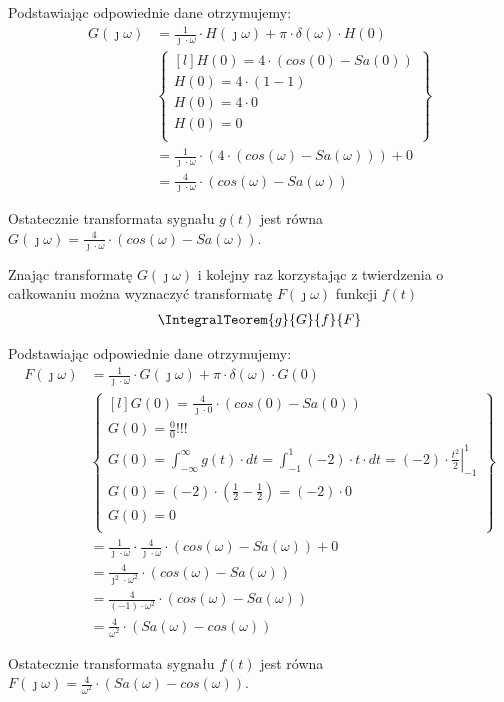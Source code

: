 \begin{task}
Podstawiając odpowiednie dane otrzymujemy:
 \begin{align*}
G(\jmath \omega) &= \frac{1}{\jmath \cdot \omega} \cdot H(\jmath \omega) + \pi \cdot \delta(\omega) \cdot H(0)\\
&\begin{Bmatrix*}[l]
H(0)=4\cdot \left(cos\left( 0\right) - Sa\left( 0\right)\right)\\
H(0)=4\cdot \left(1 -1 \right)\\
H(0)=4\cdot 0\\
H(0)=0\\
\end{Bmatrix*}\\
&=\frac{1}{\jmath \cdot \omega} \cdot \left( 4\cdot \left(cos\left( \omega\right) - Sa\left( \omega\right)\right) \right) + 0\\
&=\frac{4}{\jmath \cdot \omega} \cdot \left(cos\left( \omega\right) - Sa\left( \omega\right)\right)
\end{align*}

Ostatecznie transformata sygnału $g(t)$ jest równa $G(\jmath \omega)=\frac{4}{\jmath \cdot \omega} \cdot \left(cos\left( \omega\right) - Sa\left( \omega\right)\right)$.

Znając transformatę $G(\jmath \omega)$ i kolejny raz korzystając z twierdzenia o całkowaniu można wyznaczyć transformatę $F(\jmath \omega)$ funkcji $f(t)$
\begin{align*}
\IntegralTeorem{g}{G}{f}{F}
\end{align*}

Podstawiając odpowiednie dane otrzymujemy:
\begin{align*}
F(\jmath \omega) &= \frac{1}{\jmath \cdot \omega} \cdot G(\jmath \omega) + \pi \cdot \delta(\omega) \cdot G(0)\\
&\begin{Bmatrix*}[l]
G(0)=\frac{4}{\jmath \cdot 0} \cdot \left(cos\left( 0\right) - Sa\left(0\right)\right)\\
G(0)=\frac{0}{0}!!!\\
G(0)=\int_{-\infty}^{\infty} g(t) \cdot dt=\int_{-1}^{1} (-2) \cdot t \cdot dt = \left. (-2)\cdot \frac{t^2}{2} \right|_{-1}^{1}\\
G(0)=(-2) \cdot \left(\frac{1}{2} - \frac{1}{2}\right)= (-2) \cdot 0\\
G(0)=0\\
\end{Bmatrix*}\\
&=\frac{1}{\jmath \cdot \omega} \cdot \frac{4}{\jmath \cdot \omega} \cdot \left(cos\left( \omega\right) - Sa\left( \omega\right)\right) + 0\\
&=\frac{4}{\jmath^2 \cdot \omega^2} \cdot \left(cos\left( \omega\right) - Sa\left( \omega\right)\right)\\
&=\frac{4}{(-1) \cdot \omega^2} \cdot \left(cos\left( \omega\right) - Sa\left( \omega\right)\right)\\
&=\frac{4}{\omega^2} \cdot \left(Sa\left( \omega\right) - cos\left( \omega\right)\right)
\end{align*}

Ostatecznie transformata sygnału $f(t)$ jest równa $F(\jmath \omega)=\frac{4}{\omega^2} \cdot \left(Sa\left( \omega\right) - cos\left( \omega\right)\right)$.
\end{task}

